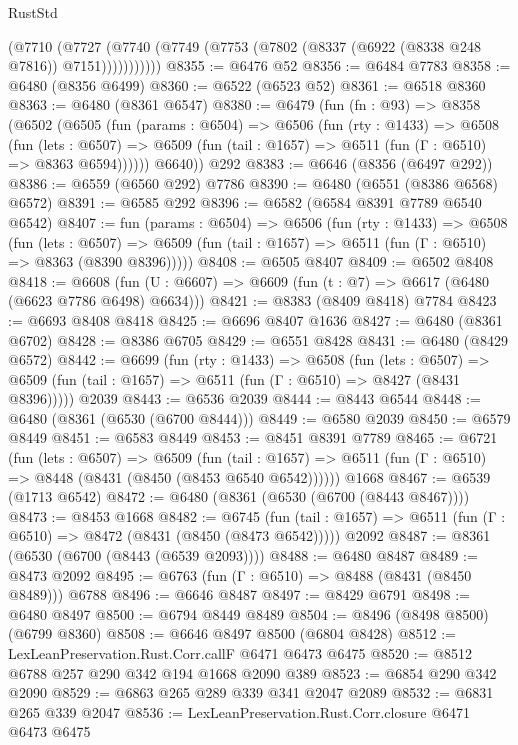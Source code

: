 \begin{lexlean}{RustStd}
\begin{coremodule}
            (@7710
              (@7727 (@7740 (@7749 (@7753 (@7802 (@8337 (@6922 (@8338 @248 @7816)) @7151)))))))))))
@8355 := @6476 @52
@8356 := @6484 @7783
@8358 := @6480 (@8356 @6499)
@8360 := @6522 (@6523 @52)
@8361 := @6518 @8360
@8363 := @6480 (@8361 @6547)
@8380 := @6479
    (fun (fn : @93) =>
    @8358
      (@6502
        (@6505
          (fun (params : @6504) =>
          @6506
            (fun (rty : @1433) =>
            @6508
              (fun (lets : @6507) =>
              @6509 (fun (tail : @1657) => @6511 (fun (Γ : @6510) => @8363 @6594))))))
        @6640))
    @292
@8383 := @6646 (@8356 (@6497 @292))
@8386 := @6559 (@6560 @292) @7786
@8390 := @6480 (@6551 (@8386 @6568) @6572)
@8391 := @6585 @292
@8396 := @6582 (@6584 @8391 @7789 @6540 @6542)
@8407 := fun (params : @6504) =>
  @6506
    (fun (rty : @1433) =>
    @6508
      (fun (lets : @6507) =>
      @6509 (fun (tail : @1657) => @6511 (fun (Γ : @6510) => @8363 (@8390 @8396)))))
@8408 := @6505 @8407
@8409 := @6502 @8408
@8418 := @6608 (fun (U : @6607) => @6609 (fun (t : @7) => @6617 (@6480 (@6623 @7786 @6498) @6634)))
@8421 := @8383 (@8409 @8418) @7784
@8423 := @6693 @8408 @8418
@8425 := @6696 @8407 @1636
@8427 := @6480 (@8361 @6702)
@8428 := @8386 @6705
@8429 := @6551 @8428
@8431 := @6480 (@8429 @6572)
@8442 := @6699
    (fun (rty : @1433) =>
    @6508
      (fun (lets : @6507) =>
      @6509 (fun (tail : @1657) => @6511 (fun (Γ : @6510) => @8427 (@8431 @8396)))))
    @2039
@8443 := @6536 @2039
@8444 := @8443 @6544
@8448 := @6480 (@8361 (@6530 (@6700 @8444)))
@8449 := @6580 @2039
@8450 := @6579 @8449
@8451 := @6583 @8449
@8453 := @8451 @8391 @7789
@8465 := @6721
    (fun (lets : @6507) =>
    @6509
      (fun (tail : @1657) => @6511 (fun (Γ : @6510) => @8448 (@8431 (@8450 (@8453 @6540 @6542))))))
    @1668
@8467 := @6539 (@1713 @6542)
@8472 := @6480 (@8361 (@6530 (@6700 (@8443 @8467))))
@8473 := @8453 @1668
@8482 := @6745
    (fun (tail : @1657) => @6511 (fun (Γ : @6510) => @8472 (@8431 (@8450 (@8473 @6542)))))
    @2092
@8487 := @8361 (@6530 (@6700 (@8443 (@6539 @2093))))
@8488 := @6480 @8487
@8489 := @8473 @2092
@8495 := @6763 (fun (Γ : @6510) => @8488 (@8431 (@8450 @8489))) @6788
@8496 := @6646 @8487
@8497 := @8429 @6791
@8498 := @6480 @8497
@8500 := @6794 @8449 @8489
@8504 := @8496 (@8498 @8500) (@6799 @8360)
@8508 := @6646 @8497 @8500 (@6804 @8428)
@8512 := LexLeanPreservation.Rust.Corr.callF @6471 @6473 @6475
@8520 := @8512 @6788 @257 @290 @342 @194 @1668 @2090 @389
@8523 := @6854 @290 @342 @2090
@8529 := @6863 @265 @289 @339 @341 @2047 @2089
@8532 := @6831 @265 @339 @2047
@8536 := LexLeanPreservation.Rust.Corr.closure @6471 @6473 @6475

\end{coremodule}
\end{lexlean}
